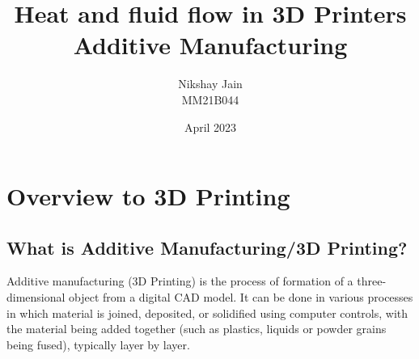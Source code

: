 \documentclass{report}
\title{\textbf{Heat and fluid flow in 3D Printers \\ Additive Manufacturing}}
\author{\Large{Nikshay Jain}\\MM21B044}
\date{April 2023}
\begin{document}
\maketitle
\tableofcontents

\chapter{Overview to 3D Printing}
\section{What is Additive Manufacturing/3D Printing?}
Additive manufacturing (3D Printing) is the process of formation of a three-dimensional object from a digital CAD model. It can be done in various processes in which material is joined, deposited, or solidified using computer controls, with the material being added together (such as plastics, liquids or powder grains being fused), typically layer by layer.
\end{document}
